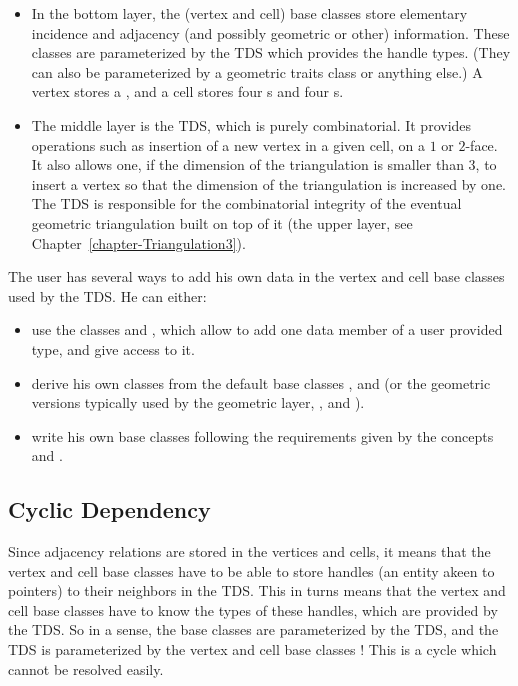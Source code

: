 \begin{itemize}
\item{} In the bottom layer, the (vertex and cell) base classes store
elementary incidence and adjacency (and possibly geometric or other)
information.  These classes are parameterized by the TDS which provides the
handle types.  (They can also be parameterized by a geometric traits class or
anything else.) A vertex stores a , and a cell stores four
s and four s.

\item{} The middle layer is the TDS, which is purely combinatorial.  It
provides operations such as insertion of a new vertex in a given cell, on a $1$
or $2$-face. It also allows one, if the dimension of the triangulation is
smaller than $3$, to insert a vertex so that the dimension of the triangulation
is increased by one. The TDS is responsible for the combinatorial integrity of
the eventual geometric triangulation built on top of it (the upper layer,
see Chapter~\ref{chapter-Triangulation3}).
\end{itemize}

The user has several ways to add his own data in the vertex and cell base classes used by the TDS.  He can either:
\begin{itemize}
\item{} use the classes 
and , which allow to add one data member
of a user provided type, and give access to it.
\item{} derive his own classes from the default base classes
, and  (or
the geometric versions typically used by the geometric layer,
, and ).
\item{} write his own base classes following the requirements given by the
concepts  and 
.
\end{itemize}

\subsection{Cyclic Dependency}
\label{tds3-cyclic}

Since adjacency relations are stored in the vertices and cells, it means that
the vertex and cell base classes have to be able to store handles (an entity
akeen to pointers) to their neighbors in the TDS.  This in turns means that the
vertex and cell base classes have to know the types of these handles, which are
provided by the TDS.  So in a sense, the base classes are parameterized by the
TDS, and the TDS is parameterized by the vertex and cell base classes !
This is a cycle which cannot be resolved easily.

